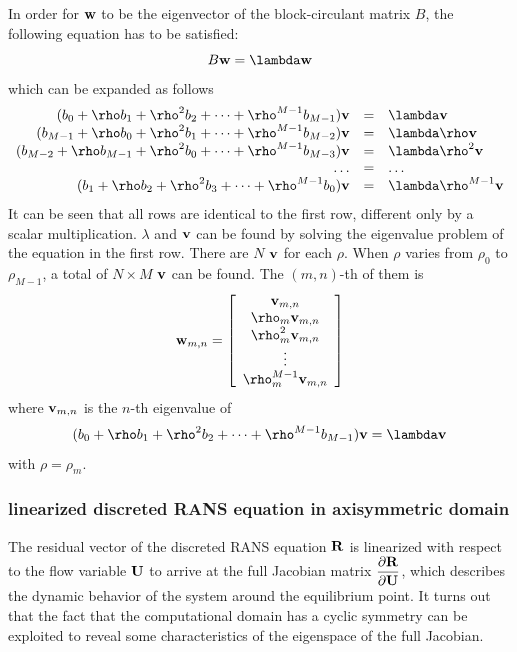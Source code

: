 \documentclass[journal,final]{new-aiaa}
\begin{document}
In order for $\mathbf{w}$ to be the eigenvector of the block-circulant matrix $B$,
the following equation has to be satisfied:
\begin{equation*}
B \w = \lambda \w
\end{equation*}
which can be expanded as follows
\begin{equation*}
\begin{array}{rcl}
(b_0 + \rho b_1+ \rho^2 b_2 + \cdots + \rho ^{M-1}b_{M-1}) \vv& = & \lambda \vv\\
(b_{M-1} + \rho b_0+ \rho^2 b_1 + \cdots + \rho ^{M-1}b_{M-2}) \vv& = & \lambda\rho  \vv\\
(b_{M-2} + \rho b_{M-1}+ \rho^2 b_0 + \cdots + \rho ^{M-1}b_{M-3}) \vv& = & \lambda\rho^2  \vv\\
\dots & = & \dots\\
(b_1 + \rho b_2+ \rho^2 b_3 + \cdots + \rho ^{M-1}b_{0}) \vv& = & \lambda\rho^{M-1} \vv\\
\end{array}
\end{equation*}
It can be seen that all rows are identical to the first row, different only by a scalar multiplication.
$\lambda$ and $\mathbf{v}$ can be found by solving the eigenvalue problem of the equation
in the first row. There are $N$ $\mathbf{v}$ for each $\rho$. When $\rho$ varies from $\rho_0$
to $\rho_{M-1}$, a total of $N\times M$ $\mathbf{v}$ can be found. The $(m,n)$-th of them is
\begin{equation*}
\w_{m,n}=
\left[
\begin{array}{c}
\vv_{m,n} \\
\rho_m \vv_{m,n} \\
\rho_m^2 \vv_{m,n} \\
\vdots \\
\rho_m^{M-1}\vv_{m,n}
\end{array}
\right]
\end{equation*}
where $\mathbf{v}_{m,n}$ is the $n$-th eigenvalue of 
\begin{equation*}
(b_0 + \rho b_1+ \rho^2 b_2 + \cdots + \rho^{M-1}b_{M-1}) \vv =  \lambda \vv
\end{equation*}
with $\rho=\rho_m$.


\subsubsection{linearized discreted RANS equation in axisymmetric domain}
The residual vector of the discreted RANS equation $\mathbf{R}$ is linearized with respect
to the flow variable  $\mathbf{U}$ to arrive at the full Jacobian matrix $\dfrac{\partial\mathbf{R}}{\partial\mathbf{U}}$, which describes the
dynamic behavior of the system around the equilibrium point. It turns out that the fact that
the computational domain has a cyclic symmetry can be exploited to reveal some
characteristics of the eigenspace of the full Jacobian.
\end{document}
